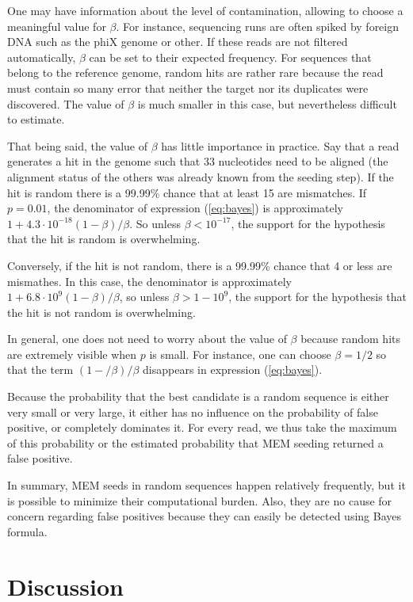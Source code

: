 \documentclass{article}
\begin{document}
One may have information about the level of contamination, allowing to
choose a meaningful value for $\beta$. For instance, sequencing runs are
often spiked by foreign DNA such as the phiX genome or other. If these
reads are not filtered automatically, $\beta$ can be set to their expected
frequency. For sequences that belong to the reference genome, random hits
are rather rare because the read must contain so many error that neither
the target nor its duplicates were discovered. The value of $\beta$ is
much smaller in this case, but nevertheless difficult to estimate.

That being said, the value of $\beta$ has little importance in practice.
Say that a read generates a hit in the genome such that 33 nucleotides
need to be aligned (the alignment status of the others was already known
from the seeding step). If the hit is random there is a 99.99\% chance
that at least 15 are mismatches. If $p = 0.01$, the denominator of
expression (\ref{eq:bayes}) is approximately $1 +
4.3\cdot10^{-18}(1-\beta)/\beta$. So unless $\beta < 10^{-17}$, the
support for the hypothesis that the hit is random is overwhelming.

Conversely, if the hit is not random, there is a 99.99\% chance that 4 or
less are mismathes. In this case, the denominator is approximately
$1+6.8\cdot10^9(1-\beta)/\beta$, so unless $\beta > 1-10^9$, the support
for the hypothesis that the hit is not random is overwhelming.

In general, one does not need to worry about the value of $\beta$ because
random hits are extremely visible when $p$ is small. For instance, one can
choose $\beta=1/2$ so that the term $(1-/\beta)/\beta$ disappears in
expression (\ref{eq:bayes}).

Because the probability that the best candidate is a random sequence is
either very small or very large, it either has no influence on the
probability of false positive, or completely dominates it. For every read,
we thus take the maximum of this probability or the estimated probability
that MEM seeding returned a false positive.

In summary, MEM seeds in random sequences happen relatively frequently,
but it is possible to minimize their computational burden. Also, they
are no cause for concern regarding false positives because they can easily
be detected using Bayes formula.



\section{Discussion}
\end{document}

